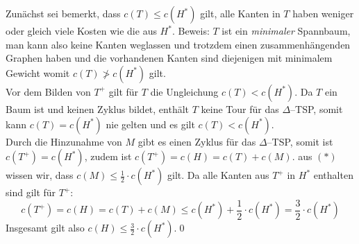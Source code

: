 \documentclass[a4paper]{article}
\begin{document}
	\maketitle
	\section{}
		Zunächst sei bemerkt, dass $c(T)\leq c(H^*)$ gilt, alle Kanten in $T$ haben weniger oder gleich viele Kosten wie die aus $H^*$.\n
		Beweis: $T$ ist ein \textit{minimaler} Spannbaum, man kann also keine Kanten weglassen und trotzdem einen zusammenhängenden Graphen haben und die vorhandenen Kanten sind diejenigen mit minimalem Gewicht womit $c(T)\not> c(H^*)$ gilt.\\
		Vor dem Bilden von $T^+$ gilt für $T$ die Ungleichung $c(T)<c(H^*)$.
		Da $T$ ein Baum ist und keinen Zyklus bildet, enthält $T$ keine Tour für das $\Delta$--TSP, somit kann $c(T)=c(H^*)$ nie gelten und es gilt $c(T)<c(H^*)$.\\
		Durch die Hinzunahme von $M$ gibt es einen Zyklus für das $\Delta$--TSP, somit ist $c(T^+)=c(H^*)$, zudem ist $c(T^+)=c(H)=c(T)+c(M)$.
		aus $(*)$ wissen wir, dass $c(M)\leq \frac{1}{2}\cdot c(H^*)$ gilt.
		Da alle Kanten aus $T^+$ in $H^*$ enthalten sind gilt für $T^+$:
		\[c(T^+)=c(H)=c(T)+c(M)\leq c(H^*)+\frac{1}{2}\cdot c(H^*)=\frac{3}{2}\cdot c(H^*)\]
		Insgesamt gilt also $c(H)\leq \frac{3}{2}\cdot c(H^*)$.\qed
	\section{}
\end{document}
